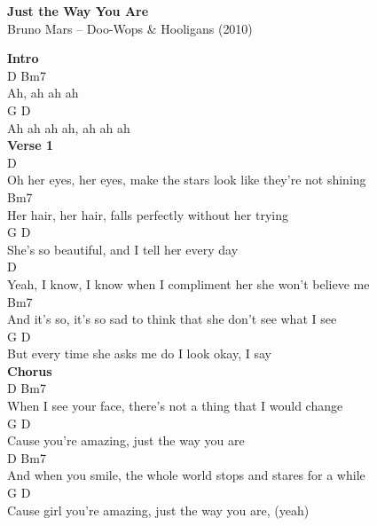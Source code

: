 \documentclass[a4paper]{article}
\begin{document}
    \begin{center}
        \textbf{Just the Way You Are}
        ~\\
        Bruno Mars -- Doo-Wops \& Hooligans (2010)
    \end{center}
    {
        \scriptsize
        \textbf{Intro}
        ~\\
        {
            \cutive
            \obeyspaces
D         Bm7
\\
Ah, ah ah ah
\\
      G            D
\\
Ah ah ah ah, ah ah ah
\\

        }
        \textbf{Verse 1}
        ~\\
        {
            \cutive
            \obeyspaces
  D
\\
Oh her eyes, her eyes, make the stars look like they're not shining
\\
Bm7
\\
 Her hair, her hair, falls perfectly without her trying
\\
G                                        D
\\
 She's so beautiful, and I tell her every day
\\
     D
\\
Yeah, I know, I know when I compliment her she won't believe me
\\
Bm7
\\
 And it's so, it's so sad to think that she don't see what I see
\\
G                                             D
\\
 But every time she asks me do I look okay, I say
\\

        }
        \textbf{Chorus}
        ~\\
        {
            \cutive
            \obeyspaces
                D                   Bm7
\\
When I see your face, there's not a thing that I would change
\\
              G                        D
\\
Cause you're amazing, just the way you are
\\
             D                      Bm7
\\
And when you smile, the whole world stops and stares for a while
\\
                   G                        D
\\
Cause girl you're amazing, just the way you are, (yeah)
\\

}}
\end{document}
